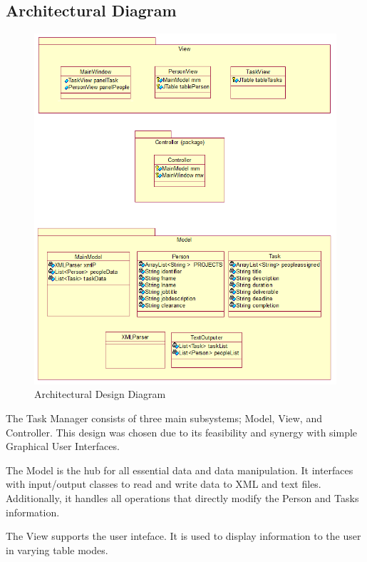 \documentclass[12pt]{article}
\newcommand{\systemName}{Task Manager }
\begin{document}
\subsection{Architectural Diagram}

\begin{figure}[htbp]
\begin{center} \includegraphics[scale=.5]{Diagrams/archDiagram.png} \end{center}
\caption{Architectural Design Diagram}
\label{fig:arch-diagram}
\end{figure}

The \systemName consists of three main subsystems; Model, View, and Controller. This design was chosen due to its feasibility and synergy with simple Graphical User Interfaces. 

The Model is the hub for all essential data and data manipulation. It interfaces with input/output classes to read and write data to XML and text files. Additionally, it handles all operations that directly modify the Person and Tasks information.

The View supports the user inteface. It is used to display information to the user in varying table modes.
\end{document}
